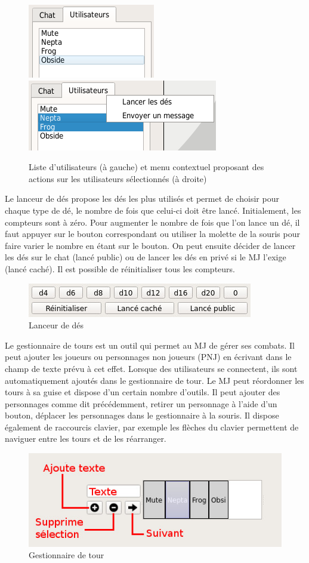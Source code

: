 \begin{figure}[h!]
	\centering
	\includegraphics[scale=0.5]{img/chat_userlist_1.png}
	\hspace{10 mm}
	\includegraphics[scale=0.5]{img/chat_userlist_2.png}
	\caption{Liste d'utilisateurs (à gauche) et menu contextuel proposant des actions sur les utilisateurs sélectionnés (à droite)}
\end{figure}

Le lanceur de dés propose les dés les plus utilisés et permet de choisir pour chaque type de dé, le nombre de fois que celui-ci doit être lancé. Initialement, les compteurs sont à zéro. Pour augmenter le nombre de fois que l'on lance un dé, il faut appuyer sur le bouton correspondant ou utiliser la molette de la souris pour faire varier le nombre en étant sur le bouton. On peut ensuite décider de lancer les dés sur le chat (lancé public) ou de lancer les dés en privé si le MJ l'exige (lancé caché). Il est possible de réinitialiser tous les compteurs.

\begin{figure}[h!]
	\centering
	\includegraphics[scale=0.5]{img/dice_manager.jpg}
	\caption{Lanceur de dés}
\end{figure}

Le gestionnaire de tours est un outil qui permet au MJ de gérer ses combats. Il peut ajouter les joueurs ou personnages non joueurs (PNJ) en écrivant dans le champ de texte prévu à cet effet. Lorsque des utilisateurs se connectent, ils sont automatiquement ajoutés dans le gestionnaire de tour. Le MJ peut réordonner les tours à sa guise et dispose d'un certain nombre d'outils. Il peut ajouter des personnages comme dit précédemment, retirer un personnage à l'aide d'un bouton, déplacer les personnages dans le gestionnaire à la souris. Il dispose également de raccourcis clavier, par exemple les flèches du clavier permettent de naviguer entre les tours et de les réarranger.

\begin{figure}[h!]
	\centering
	\includegraphics[scale=0.7]{img/turn_manager.jpg}
	\caption{Gestionnaire de tour}
\end{figure}